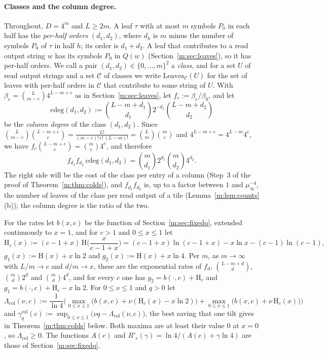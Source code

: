 \documentclass[11pt]{article}
\theoremstyle{definition}
\theoremstyle{remark}
\newcommand{\Hh}{\mathrm{H}}
\newcommand{\Leaves}{\mathrm{Leaves}}
\begin{document}
\paragraph{Classes and the column degree.} Throughout, $D=4^m$ and $L\ge2m$. A leaf $\tau$ with at most $m$ symbols $P_0$ in each half has the \emph{per-half orders} $(d_1,d_2)$, where $d_h$ is $m$ minus the number of symbols $P_0$ of $\tau$ in half $h$; its order is $d_1+d_2$. A leaf that contributes to a read output string $w$ has its symbols $P_0$ in $Q(w)$ (Section~\ref{m:sec:leaves}), so it has per-half orders. We call a pair $(d_1,d_2)\in\{0,\dots,m\}^2$ a \emph{class}, and for a set $U$ of read output strings and a set $\mathcal C$ of classes we write $\Leaves_{\mathcal C}(U)$ for the set of leaves with per-half orders in $\mathcal C$ that contribute to some string of $U$. With $\beta_e=\binom L{m-e}4^{L-m+e}$ as in Section~\ref{m:sec:leaves}, let $f_e:=\beta_e/\beta_0$, and let
\[
\mathrm{cdeg}(d_1,d_2):=\binom{L-m+d_1}{d_1}2^{-d_1}\binom{L-m+d_2}{d_2}
\]
be the \emph{column degree} of the class $(d_1,d_2)$. Since $\binom L{m-e}\binom{L-m+e}e=\frac{L!}{(m-e)!\,e!\,(L-m)!}=\binom Lm\binom me$ and $4^{L-m+e}=4^{L-m}4^e$, we have $f_e\binom{L-m+e}e=\binom me4^e$, and therefore
\begin{equation}\label{m:eq:colstar}
f_{d_1}f_{d_2}\,\mathrm{cdeg}(d_1,d_2)=\binom m{d_1}2^{d_1}\binom m{d_2}4^{d_2}.
\end{equation}
The right side will be the cost of the class per entry of a column (Step~3 of the proof of Theorem~\ref{m:thm:colds}), and $f_{d_1}f_{d_2}$ is, up to a factor between $1$ and $\mu_\infty^{-4}$, the number of leaves of the class per read output of a tile (Lemma~\ref{m:lem:counts}(b)); the column degree is the ratio of the two.

For the rates let $b(x,c)$ be the function of Section~\ref{m:sec:fixedq}, extended continuously to $x=1$, and for $c>1$ and $0\le x\le1$ let
\[
\Hh_c(x):=(c-1+x)\,\Hh\Big(\frac x{c-1+x}\Big)=(c-1+x)\ln(c-1+x)-x\ln x-(c-1)\ln(c-1),
\]
$g_1(x):=\Hh(x)+x\ln2$ and $g_2(x):=\Hh(x)+x\ln4$. Per $m$, as $m\to\infty$ with $L/m\to c$ and $d/m\to x$, these are the exponential rates of $f_d$, $\binom{L-m+d}d$, $\binom md2^d$ and $\binom md4^d$, and for every $c$ one has $g_2=b(\cdot,c)+\Hh_c$ and $g_1=b(\cdot,c)+\Hh_c-x\ln2$. For $0\le\nu\le1$ and $q>0$ let
\[
\Lambda_{\mathrm{col}}(\nu,c):=\frac1{\ln4}\Big(\max_{0\le x\le1}\big(b(x,c)+\nu(\Hh_c(x)-x\ln2)\big)+\max_{0\le x\le1}\big(b(x,c)+\nu\,\Hh_c(x)\big)\Big)
\]
and $\gamma^{\mathrm{col}}_q(c):=\sup_{0\le\nu\le1}\big(\nu q-\Lambda_{\mathrm{col}}(\nu,c)\big)$, the best saving that one tilt gives in Theorem~\ref{m:thm:colds} below. Both maxima are at least their value $0$ at $x=0$, so $\Lambda_{\mathrm{col}}\ge0$. The functions $A(c)$ and $R'_c(\gamma)=\ln4/(A(c)+\gamma\ln4)$ are those of Section~\ref{m:sec:fixedq}.
\end{document}
